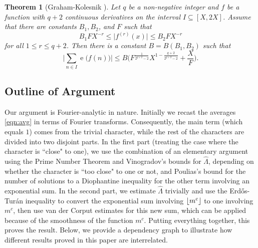 \documentclass[letterpaper, 12pt]{article}
\theoremstyle{plain}
\newtheorem{Theorem}{Theorem}
\theoremstyle{definition}
\theoremstyle{plain}
\theoremstyle{plain}
\numberwithin{equation}{section}
\newcommand{\Erdos}{Erd\H{o}s}
\newcommand{\Turan}{Tur{\'a}n}
\renewcommand{\leq}{\leqslant}
\newcommand{\1}{\textbf{1}}
\DeclarePairedDelimiter\floor{\lfloor}{\rfloor}
\DeclareMathOperator{\e}{e}
\begin{document}
\begin{Theorem}[Graham-Kolesnik ]\label{thm:vdc-estimate}
    Let $q$ be a non-negative integer and $f$ be a function with $q + 2$ continuous derivatives on the interval $I \subseteq [X, 2X]$. Assume that there are constants $B_1, B_2$, and $F$ such that 
    \begin{equation}\label{eqn:derv-bound}
        B_1 F X^{-r} \leq \lvert f^{(r)}(x)\rvert \leq B_2 F X^{-r}
    \end{equation} 
    for all $1 \leq r \leq q + 2$. Then there is a constant $B = B(B_1,B_2)$ such that 
    \[
        \biggl\lvert \sum_{n \in I} \e\bigl(f(n) \bigr) \biggr\rvert 
        \leq B \biggl(F^\frac{1}{2^{q+2}-2}X^{1-\frac{q+2}{2^{q+2}-2}} + \frac{X}{F} \biggr).
    \]
\end{Theorem}

\subsection{Outline of Argument}\label{outline}

\hspace{20pt} Our argument is Fourier-analytic in nature. Initially we recast the averages \eqref{eqn:avg} in terms of Fourier transforms. Consequently, the main term (which equals $1$) comes from the trivial character, while the rest of the characters are divided into two disjoint parts. In the first part (treating the case where the character is ``close" to one), we use the combination of an elementary argument using the Prime Number Theorem and Vinogradov's bounds for $\hat{\Lambda}$, depending on whether the character is ``too close" to one or not, and Poulias's bound for the number of solutions to a Diophantine inequality for the other term involving an exponential sum. In the second part, we estimate $\hat{\Lambda}$ trivially and use the \Erdos-\Turan{} inequality to convert the exponential sum involving $\floor{m^c}$ to one involving $m^c$, then use van der Corput estimates for this new sum, which can be applied because of the smoothness of the function $m^c$. Putting everything together, this proves the result. Below, we provide a dependency graph to illustrate how different results proved in this paper are interrelated.
\end{document}
